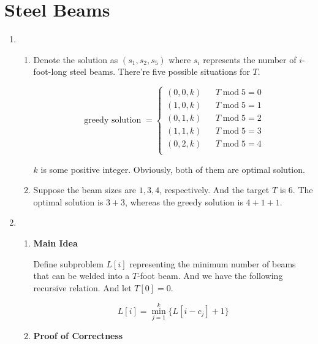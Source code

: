 \documentclass[11pt]{article}
\newenvironment{qparts}{\begin{enumerate}[{(}a{)}]}{\end{enumerate}}
\begin{document}
\section{Steel Beams}
\begin{qparts}
	
	\item 
	\renewcommand{\theenumii}{\roman{enumii}}
	\begin{enumerate}
		\item 
		
		Denote the solution as $(s_1, s_2, s_5)$ where $s_i$ represents the number of $i$-foot-long steel beams.
		There're five possible situations for $T$. 
		
		\[ \operatorname{greedy \ solution}=
		\left\{
			\begin{array}{rcl}
				(0, 0, k)       &      & T \operatorname{mod} 5 = 0  \\
				(1, 0, k)       &      & T \operatorname{mod} 5 = 1  \\
				(0, 1, k)       &      & T \operatorname{mod} 5 = 2  \\
				(1, 1, k)       &      & T \operatorname{mod} 5 = 3  \\
				(0, 2, k)       &      & T \operatorname{mod} 5 = 4  \\
			\end{array}
		\right.
		\]
		
		$k$ is some positive integer. Obviously, both of them are optimal solution.

				
		\item Suppose the beam sizes are $1, 3, 4$, respectively. And the target $T$ is 6. The optimal solution is $3+3$, whereas the greedy solution is $4+ 1 + 1$.
		
		
	\end{enumerate}
	
	\item 
	
	\renewcommand{\theenumii}{\roman{enumii}}
	\begin{enumerate}
		\item \textbf{Main Idea}
		
		Define subproblem $L[i]$ representing the minimum number of beams that can be welded into a $T$-foot beam. And we have the following recursive relation. And let $T[0] = 0$.
		
		\[
			L[i] = \min_{j=1}^{k}\{L[i - c_j] + 1\}
		\]
		
		\item \textbf{Proof of Correctness}
		

\end{enumerate}
\end{qparts}
\end{document}
